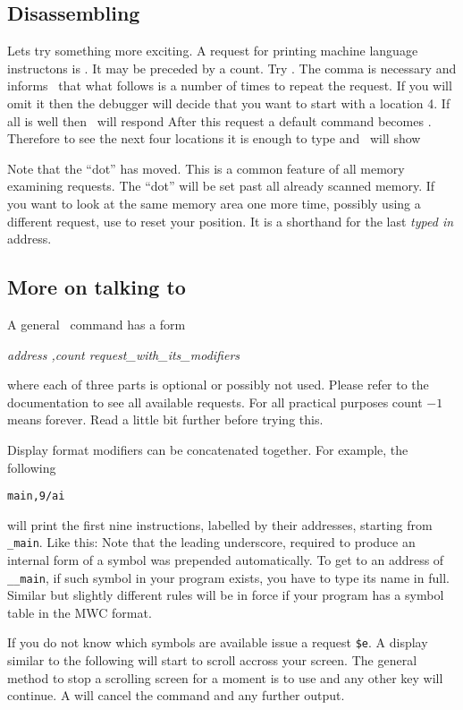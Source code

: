 \subsection{Disassembling}
Lets try something more exciting.  A request for printing machine
language instructons is .  It may be preceded by a count.
Try .  The comma is necessary and informs \szadb\
that what follows is a number of times to repeat the request.
If you will omit it then the debugger will decide that 
you want to start with a location 4.
If all is well then \szadb\ will respond
After this request a default command becomes .  Therefore to see
the next four locations it is enough to type \name{,4} and \szadb\
will show
\readexample{reptdis.exm}
\par
Note that the ``dot'' has moved.  This is a common feature of all memory 
examining requests. The  ``dot'' will be set past all already scanned
memory.  If you want to look at the same memory area one more time,
possibly using a different request,
use \name{\&} to reset your position.
It is a shorthand for the last {\em typed in\/} address.

\subsection{More on talking to \szadb}
A general \szadb\ command has a form
\begin{exmpl}
	{\it address ,count request\_with\_its\_modifiers}
\end{exmpl}
where each of three parts is optional or possibly not used.
Please refer to the documentation to see all available requests.
For all practical purposes count $-1$ means forever.
Read a little bit further before trying this.

Display format modifiers can be concatenated together. For example,
the following
\begin{exmpl}
	{\tt main,9/ai}
\end{exmpl}
will print the first nine instructions,
labelled by their addresses, starting from \verb|_main|. Like this:
\readexample{maindis.exm}
Note that the leading underscore, required to produce an internal form of
a symbol \name{main} was prepended automatically.  To get to an
address of \verb|__main|, if such symbol in your program exists,
you have to type its name in full.  Similar but slightly different
rules will be in force if your program has a symbol table
in the MWC format.

If you do not know which symbols are available issue a request \verb|$e|.
A display similar to the following will start to scroll accross your screen.
\readexample{symbols.exm}
The general method to stop a scrolling screen
for a moment is to use  and any other key will
continue.  A \key{\carret C} will cancel the command and any further
output.

